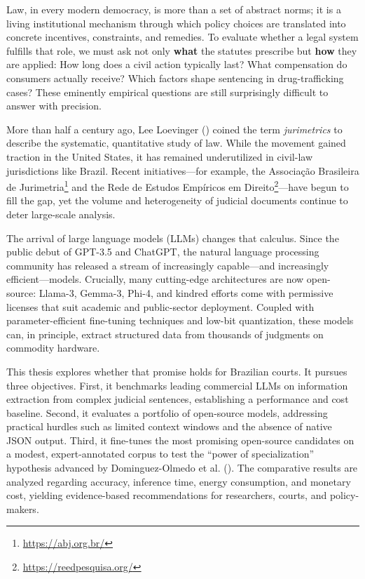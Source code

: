 \documentclass[
  12pt,
]{article}
\begin{document}
\vspace*{\fill}

Law, in every modern democracy, is more than a set of abstract norms; it
is a living institutional mechanism through which policy choices are
translated into concrete incentives, constraints, and remedies. To
evaluate whether a legal system fulfills that role, we must ask not only
\textbf{what} the statutes prescribe but \textbf{how} they are applied:
How long does a civil action typically last? What compensation do
consumers actually receive? Which factors shape sentencing in
drug-trafficking cases? These eminently empirical questions are still
surprisingly difficult to answer with precision.

More than half a century ago, Lee Loevinger
() coined the term
\emph{jurimetrics} to describe the systematic, quantitative study of
law. While the movement gained traction in the United States, it has
remained underutilized in civil-law jurisdictions like Brazil. Recent
initiatives---for example, the Associação Brasileira de
Jurimetria\footnote{\url{https://abj.org.br/}} and the Rede de Estudos
Empíricos em Direito\footnote{\url{https://reedpesquisa.org/}}---have
begun to fill the gap, yet the volume and heterogeneity of judicial
documents continue to deter large-scale analysis.

The arrival of large language models (LLMs) changes that calculus. Since
the public debut of GPT-3.5 and ChatGPT, the natural language processing
community has released a stream of increasingly capable---and
increasingly efficient---models. Crucially, many cutting-edge
architectures are now open-source: Llama-3, Gemma-3, Phi-4, and kindred
efforts come with permissive licenses that suit academic and
public-sector deployment. Coupled with parameter-efficient fine-tuning
techniques and low-bit quantization, these models can, in principle,
extract structured data from thousands of judgments on commodity
hardware.

This thesis explores whether that promise holds for Brazilian courts. It
pursues three objectives. First, it benchmarks leading commercial LLMs
on information extraction from complex judicial sentences, establishing
a performance and cost baseline. Second, it evaluates a portfolio of
open-source models, addressing practical hurdles such as limited context
windows and the absence of native JSON output. Third, it fine-tunes the
most promising open-source candidates on a modest, expert-annotated
corpus to test the ``power of specialization'' hypothesis advanced by
Dominguez-Olmedo et al.
(). The comparative
results are analyzed regarding accuracy, inference time, energy
consumption, and monetary cost, yielding evidence-based recommendations
for researchers, courts, and policy-makers.
\end{document}
